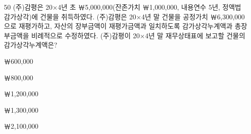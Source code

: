 \begin{question}{50}
(주)감평은 20×4년 초 ￦5,000,000(잔존가치 ￦1,000,000, 내용연수 5년, 정액법 감가상각)에 건물을 취득하였다. (주)감평은 20×4년 말 건물을 공정가치 ￦6,300,000으로 재평가하고, 자산의 장부금액이 재평가금액과 일치하도록 감가상각누계액과 총장부금액을 비례적으로 수정하였다. (주)감평이 20×4년 말 재무상태표에 보고할 건물의 감가상각누계액은?
\begin{choices}
  \item ￦600,000
  \item ￦800,000
  \item ￦1,200,000
  \item ￦1,300,000
  \item ￦2,100,000
\end{choices}
\end{question}
